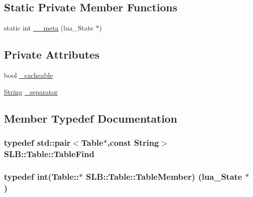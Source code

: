 \subsection*{Static Private Member Functions}
\begin{DoxyCompactItemize}
\item 
static int \hyperlink{classSLB_1_1Table_a66aeaedac830b1fcc1d0941c5804ebdc}{\+\_\+\+\_\+meta} (lua\+\_\+\+State $\ast$)
\end{DoxyCompactItemize}
\subsection*{Private Attributes}
\begin{DoxyCompactItemize}
\item 
bool \hyperlink{classSLB_1_1Table_a89c1681219db93cc26ca2cb85ff72a6c}{\+\_\+cacheable}
\item 
\hyperlink{namespaceSLB_a6a4c36e7004d99c0535c2c91c200c9a1}{String} \hyperlink{classSLB_1_1Table_a45ae383146c7d53a5d52e395e926f429}{\+\_\+separator}
\end{DoxyCompactItemize}


\subsection{Member Typedef Documentation}
\subsubsection[{\texorpdfstring{Table\+Find}{TableFind}}]{\setlength{\rightskip}{0pt plus 5cm}typedef std\+::pair$<${\bf Table}$\ast$,const {\bf String}$>$ {\bf S\+L\+B\+::\+Table\+::\+Table\+Find}\hspace{0.3cm}{\ttfamily [private]}}\hypertarget{classSLB_1_1Table_abd5bba39a3038a146461da289daf55e7}{}\label{classSLB_1_1Table_abd5bba39a3038a146461da289daf55e7}
\subsubsection[{\texorpdfstring{Table\+Member}{TableMember}}]{\setlength{\rightskip}{0pt plus 5cm}typedef int(Table\+::$\ast$ S\+L\+B\+::\+Table\+::\+Table\+Member) (lua\+\_\+\+State $\ast$)\hspace{0.3cm}{\ttfamily [private]}}\hypertarget{classSLB_1_1Table_a9517177ecd7a0bf985ff9635b0771a32}{}\label{classSLB_1_1Table_a9517177ecd7a0bf985ff9635b0771a32}


